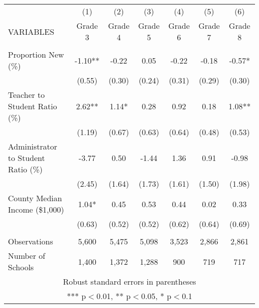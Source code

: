 \begin{tabular}{lcccccc}
\hline\hline
 & (1) & (2) & (3) & (4) & (5) & (6) \\
VARIABLES & Grade 3 & Grade 4 & Grade 5 & Grade 6 & Grade 7 & Grade 8 \\ \hline
 &  &  &  &  &  &  \\
Proportion New (\%) & -1.10** & -0.22 & 0.05 & -0.22 & -0.18 & -0.57* \\
 & (0.55) & (0.30) & (0.24) & (0.31) & (0.29) & (0.30) \\
Teacher to Student Ratio (\%) & 2.62** & 1.14* & 0.28 & 0.92 & 0.18 & 1.08** \\
 & (1.19) & (0.67) & (0.63) & (0.64) & (0.48) & (0.53) \\
Administrator to Student Ratio (\%) & -3.77 & 0.50 & -1.44 & 1.36 & 0.91 & -0.98 \\
 & (2.45) & (1.64) & (1.73) & (1.61) & (1.50) & (1.98) \\
County Median Income (\$1,000) & 1.04* & 0.45 & 0.53 & 0.44 & 0.02 & 0.33 \\
 & (0.63) & (0.52) & (0.52) & (0.62) & (0.64) & (0.69) \\
 &  &  &  &  &  &  \\
Observations & 5,600 & 5,475 & 5,098 & 3,523 & 2,866 & 2,861 \\
 Number of Schools & 1,400 & 1,372 & 1,288 & 900 & 719 & 717 \\ \hline\hline
\multicolumn{7}{c}{ Robust standard errors in parentheses} \\
\multicolumn{7}{c}{ *** p$<$0.01, ** p$<$0.05, * p$<$0.1} \\
\end{tabular}
